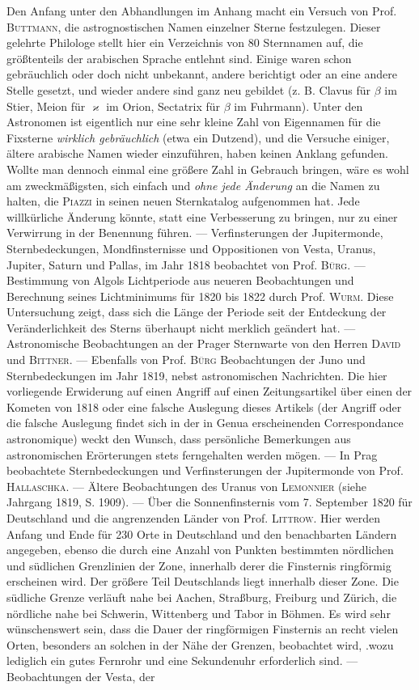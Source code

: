 \begingroup{}\relax
Den Anfang unter den Abhandlungen im Anhang macht ein Versuch von Prof. \textsc{Buttmann}, die astrognostischen Namen einzelner Sterne festzulegen. Dieser gelehrte Philologe stellt hier ein Verzeichnis von 80 Sternnamen auf, die größtenteils der arabischen Sprache entlehnt sind. Einige waren schon gebräuchlich oder doch nicht unbekannt, andere berichtigt oder an eine andere Stelle gesetzt, und wieder andere sind ganz neu gebildet (z. B. Clavus für $\beta$ im Stier, Meion für $\varkappa$ im Orion, 
Sectatrix für $\beta$ im Fuhrmann). Unter den Astronomen ist eigentlich nur eine sehr kleine Zahl von Eigennamen für die Fixsterne \emph{wirklich gebräuchlich} (etwa ein Dutzend), und die Versuche einiger, ältere arabische Namen wieder einzuführen, haben keinen Anklang gefunden. Wollte man dennoch einmal eine größere Zahl in Gebrauch bringen, wäre es wohl am zweckmäßigsten, sich einfach und \emph{ohne jede Änderung} an die Namen zu halten, die \textsc{Piazzi} in seinen neuen Sternkatalog aufgenommen hat. Jede willkürliche Änderung könnte, statt eine Verbesserung zu bringen, nur zu einer Verwirrung in der Benennung führen. --- Verfinsterungen der Jupitermonde, Sternbedeckungen, Mondfinsternisse und Oppositionen von Vesta, Uranus, Jupiter, Saturn und Pallas, im Jahr 1818 beobachtet von Prof. \textsc{Bürg}. --- Bestimmung von Algols Lichtperiode aus neueren Beobachtungen und Berechnung seines Lichtminimums für 1820 bis 1822 durch Prof. \textsc{Wurm}. Diese Untersuchung zeigt, dass sich die Länge der Periode seit der Entdeckung der Veränderlichkeit des Sterns überhaupt nicht merklich geändert hat. --- Astronomische Beobachtungen an der Prager Sternwarte von den Herren \textsc{David} und \textsc{Bittner}. --- Ebenfalls von Prof. \textsc{Bürg} Beobachtungen der Juno und Sternbedeckungen im Jahr 1819, nebst astronomischen Nachrichten. Die hier vorliegende Erwiderung auf einen Angriff auf einen Zeitungsartikel über einen der Kometen von 1818 oder eine falsche Auslegung dieses Artikels (der Angriff oder die falsche Auslegung findet sich in der in Genua erscheinenden Correspondance astronomique) weckt den Wunsch, dass persönliche Bemerkungen aus astronomischen Erörterungen stets ferngehalten werden mögen. --- In Prag beobachtete Sternbedeckungen und Verfinsterungen der Jupitermonde von Prof. \textsc{Hallaschka}. --- Ältere Beobachtungen des Uranus von \textsc{Lemonnier} (siehe Jahrgang 1819, S. 1909). --- Über die Sonnenfinsternis vom 7. September 1820 für Deutschland und die angrenzenden Länder von Prof. \textsc{Littrow}. Hier werden Anfang und Ende für 230 Orte in Deutschland und den benachbarten Ländern angegeben, ebenso die durch eine Anzahl von Punkten bestimmten nördlichen und südlichen Grenzlinien der Zone, innerhalb derer die Finsternis ringförmig erscheinen wird. Der größere Teil Deutschlands liegt innerhalb dieser Zone. Die südliche Grenze verläuft nahe bei Aachen, Straßburg, Freiburg und Zürich, die nördliche nahe bei Schwerin, Wittenberg und Tabor in Böhmen. Es wird sehr wünschenswert sein, dass die Dauer der ringförmigen Finsternis an recht vielen Orten, besonders an solchen in der Nähe der Grenzen, beobachtet wird, .wozu lediglich ein gutes Fernrohr und eine Sekundenuhr erforderlich sind. --- Beobachtungen der Vesta, der 